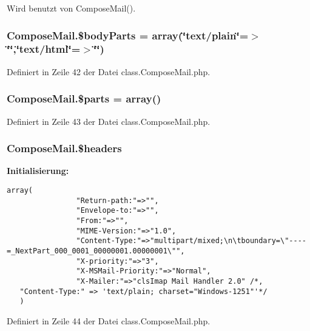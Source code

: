 Wird benutzt von ComposeMail().
\subsubsection{\setlength{\rightskip}{0pt plus 5cm}ComposeMail.\$bodyParts = array(\char`\"{}text/plain\char`\"{}=$>$\char`\"{}\char`\"{},\char`\"{}text/html\char`\"{}=$>$\char`\"{}\char`\"{})}\label{classComposeMail_189b7309556a8ecad05cef268ae277f5}




Definiert in Zeile 42 der Datei class.ComposeMail.php.
\subsubsection{\setlength{\rightskip}{0pt plus 5cm}ComposeMail.\$parts = array()}\label{classComposeMail_74a7866a544d748e7466267778c62aec}




Definiert in Zeile 43 der Datei class.ComposeMail.php.
\subsubsection{\setlength{\rightskip}{0pt plus 5cm}ComposeMail.\$headers}\label{classComposeMail_bc0db02027e3cd1577e863b8a2aaf4f1}


\textbf{Initialisierung:}

\begin{Code}\begin{verbatim}array(
                "Return-path:"=>"",
                "Envelope-to:"=>"",
                "From:"=>"",
                "MIME-Version:"=>"1.0",
                "Content-Type:"=>"multipart/mixed;\n\tboundary=\"----=_NextPart_000_0001_00000001.00000001\"",
                "X-priority:"=>"3",
                "X-MSMail-Priority:"=>"Normal",
                "X-Mailer:"=>"clsImap Mail Handler 2.0" /*,
   "Content-Type:" => 'text/plain; charset="Windows-1251"'*/
   )
\end{verbatim}
\end{Code}


Definiert in Zeile 44 der Datei class.ComposeMail.php.
